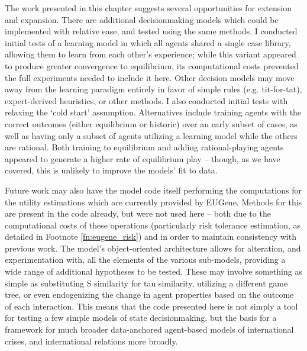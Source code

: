 The work presented in this chapter suggests several opportunities for extension and expansion. There are additional decisionmaking models which could be implemented with relative ease, and tested using the same methods. I conducted initial tests of a learning model in which all agents shared a single case library, allowing them to learn from each other's experience; while this variant appeared to produce greater convergence to equilibrium, its computational costs prevented the full experiments needed to include it here. Other decision models may move away from the learning paradigm entirely in favor of simple rules (e.g. tit-for-tat), expert-derived heuristics, or other methods. I also conducted initial tests with relaxing the `cold start' assumption. Alternatives include training agents with the correct outcomes (either equilibrium or historic) over an early subset of cases, as well as having only a subset of agents utilizing a learning model while the others are rational. Both training to equilibrium and adding rational-playing agents appeared to generate a higher rate of equilibrium play -- though, as we have covered, this is unlikely to improve the models' fit to data.

Future work may also have the model code itself performing the computations for the utility estimations which are currently provided by EUGene. Methods for this are present in the code already, but were not used here -- both due to the computational costs of these operations (particularly risk tolerance estimation, as detailed in Footnote \ref{fn:eugene_risk}) and in order to maintain consistency with previous work. The model's object-oriented architecture allows for alteration, and experimentation with, all the elements of the various sub-models, providing a wide range of additional hypotheses to be tested. These may involve something as simple as substituting S similarity for tau similarity, utilizing a different game tree, or even endogenizing the change in agent properties based on the outcome of each interaction. This means that the code presented here is not simply a tool for testing a few simple models of state decisionmaking, but the basis for a framework for much broader data-anchored agent-based models of international crises, and international relations more broadly.

